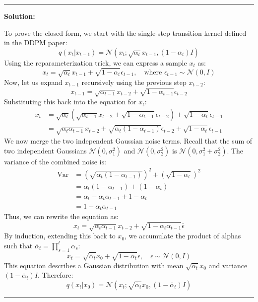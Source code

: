 \documentclass[a4paper,12pt]{article}
\newenvironment{solutionbox}{
    \par
    \vspace{0.5em}
    \noindent
    {\color{primary}\rule{\linewidth}{0.4pt}}
    \par\smallskip
    \noindent\textbf{\color{primary}Solution:}
    \par\smallskip
    \small
}{
    \par\smallskip
    {\color{primary}\rule{\linewidth}{0.4pt}}
    \par\vspace{0.5em}
}
\begin{document}
\begin{solutionbox}
    To prove the closed form, we start with the single-step transition kernel defined in the DDPM paper:
    \begin{equation}
        q(x_t | x_{t-1}) = \mathcal{N}(x_t; \sqrt{\alpha_t} x_{t-1}, (1 - \alpha_t) I)
    \end{equation}
    Using the reparameterization trick, we can express a sample $x_t$ as:
    \begin{equation}
        x_t = \sqrt{\alpha_t} x_{t-1} + \sqrt{1 - \alpha_t} \epsilon_{t-1}, \quad \text{where } \epsilon_{t-1} \sim \mathcal{N}(0, I)
    \end{equation}
    Now, let us expand $x_{t-1}$ recursively using the previous step $x_{t-2}$:
    \begin{equation}
        x_{t-1} = \sqrt{\alpha_{t-1}} x_{t-2} + \sqrt{1 - \alpha_{t-1}} \epsilon_{t-2}
    \end{equation}
    Substituting this back into the equation for $x_t$:
    \begin{align*}
        x_t &= \sqrt{\alpha_t} (\sqrt{\alpha_{t-1}} x_{t-2} + \sqrt{1 - \alpha_{t-1}} \epsilon_{t-2}) + \sqrt{1 - \alpha_t} \epsilon_{t-1} \\
        &= \sqrt{\alpha_t \alpha_{t-1}} x_{t-2} + \sqrt{\alpha_t (1 - \alpha_{t-1})} \epsilon_{t-2} + \sqrt{1 - \alpha_t} \epsilon_{t-1}
    \end{align*}
    We now merge the two independent Gaussian noise terms. Recall that the sum of two independent Gaussians $\mathcal{N}(0, \sigma_1^2)$ and $\mathcal{N}(0, \sigma_2^2)$ is $\mathcal{N}(0, \sigma_1^2 + \sigma_2^2)$. The variance of the combined noise is:
    \begin{align*}
        \text{Var} &= (\sqrt{\alpha_t (1 - \alpha_{t-1})})^2 + (\sqrt{1 - \alpha_t})^2 \\
        &= \alpha_t (1 - \alpha_{t-1}) + (1 - \alpha_t) \\
        &= \alpha_t - \alpha_t \alpha_{t-1} + 1 - \alpha_t \\
        &= 1 - \alpha_t \alpha_{t-1}
    \end{align*}
    Thus, we can rewrite the equation as:
    \begin{equation}
        x_t = \sqrt{\alpha_t \alpha_{t-1}} x_{t-2} + \sqrt{1 - \alpha_t \alpha_{t-1}} \bar{\epsilon}
    \end{equation}
    By induction, extending this back to $x_0$, we accumulate the product of alphas such that $\bar{\alpha}_t = \prod_{s=1}^t \alpha_s$:
    \begin{equation}
        x_t = \sqrt{\bar{\alpha}_t} x_0 + \sqrt{1 - \bar{\alpha}_t} \epsilon, \quad \epsilon \sim \mathcal{N}(0, I)
    \end{equation}
    This equation describes a Gaussian distribution with mean $\sqrt{\bar{\alpha}_t} x_0$ and variance $(1 - \bar{\alpha}_t) I$. Therefore:
    \begin{equation}
        q(x_t | x_0) = \mathcal{N}(x_t; \sqrt{\bar{\alpha}_t} x_0, (1 - \bar{\alpha}_t) I)
    \end{equation}
\end{solutionbox}
\end{document}
